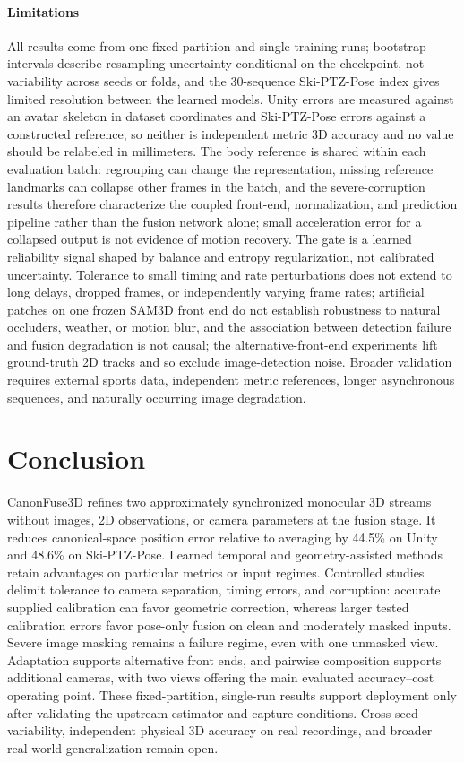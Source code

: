 \documentclass[preprint,12pt]{elsarticle}
\begin{document}
\paragraph{Limitations}
All results come from one fixed partition and single training runs; bootstrap intervals describe resampling uncertainty conditional on the checkpoint, not variability across seeds or folds, and the 30-sequence Ski-PTZ-Pose index gives limited resolution between the learned models. Unity errors are measured against an avatar skeleton in dataset coordinates and Ski-PTZ-Pose errors against a constructed reference, so neither is independent metric 3D accuracy and no value should be relabeled in millimeters. The body reference is shared within each evaluation batch: regrouping can change the representation, missing reference landmarks can collapse other frames in the batch, and the severe-corruption results therefore characterize the coupled front-end, normalization, and prediction pipeline rather than the fusion network alone; small acceleration error for a collapsed output is not evidence of motion recovery. The gate is a learned reliability signal shaped by balance and entropy regularization, not calibrated uncertainty. Tolerance to small timing and rate perturbations does not extend to long delays, dropped frames, or independently varying frame rates; artificial patches on one frozen SAM3D front end do not establish robustness to natural occluders, weather, or motion blur, and the association between detection failure and fusion degradation is not causal; the alternative-front-end experiments lift ground-truth 2D tracks and so exclude image-detection noise. Broader validation requires external sports data, independent metric references, longer asynchronous sequences, and naturally occurring image degradation.

\section{Conclusion}
\label{sec:conclusion}

CanonFuse3D refines two approximately synchronized monocular 3D streams without images, 2D observations, or camera parameters at the fusion stage. It reduces canonical-space position error relative to averaging by 44.5\% on Unity and 48.6\% on Ski-PTZ-Pose. Learned temporal and geometry-assisted methods retain advantages on particular metrics or input regimes. Controlled studies delimit tolerance to camera separation, timing errors, and corruption: accurate supplied calibration can favor geometric correction, whereas larger tested calibration errors favor pose-only fusion on clean and moderately masked inputs. Severe image masking remains a failure regime, even with one unmasked view. Adaptation supports alternative front ends, and pairwise composition supports additional cameras, with two views offering the main evaluated accuracy--cost operating point. These fixed-partition, single-run results support deployment only after validating the upstream estimator and capture conditions. Cross-seed variability, independent physical 3D accuracy on real recordings, and broader real-world generalization remain open.
\end{document}
